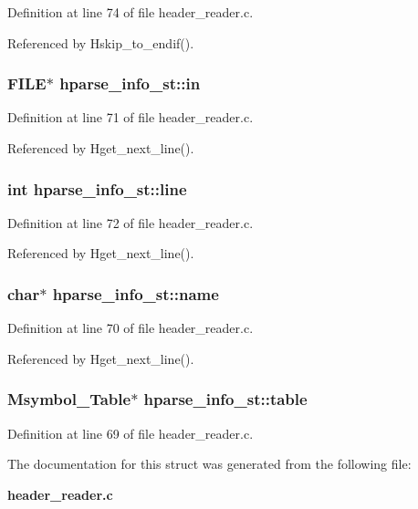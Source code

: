 Definition at line 74 of file header\_\-reader.c.

Referenced by Hskip\_\-to\_\-endif().
\subsubsection{\setlength{\rightskip}{0pt plus 5cm}FILE$\ast$ \bf{hparse\_\-info\_\-st::in}}\label{structhparse__info__st_4f67d1e4720eb89684dab7b7d847ea9c}




Definition at line 71 of file header\_\-reader.c.

Referenced by Hget\_\-next\_\-line().
\subsubsection{\setlength{\rightskip}{0pt plus 5cm}int \bf{hparse\_\-info\_\-st::line}}\label{structhparse__info__st_fc6e23cc1b24fd8660de0f5a76f94c03}




Definition at line 72 of file header\_\-reader.c.

Referenced by Hget\_\-next\_\-line().
\subsubsection{\setlength{\rightskip}{0pt plus 5cm}char$\ast$ \bf{hparse\_\-info\_\-st::name}}\label{structhparse__info__st_e6f44529056b337ea7faef2fd8380191}




Definition at line 70 of file header\_\-reader.c.

Referenced by Hget\_\-next\_\-line().
\subsubsection{\setlength{\rightskip}{0pt plus 5cm}\bf{Msymbol\_\-Table}$\ast$ \bf{hparse\_\-info\_\-st::table}}\label{structhparse__info__st_d5cd7dcec657337c479077eb94b9af16}




Definition at line 69 of file header\_\-reader.c.

The documentation for this struct was generated from the following file:\begin{CompactItemize}
\item 
\bf{header\_\-reader.c}\end{CompactItemize}
